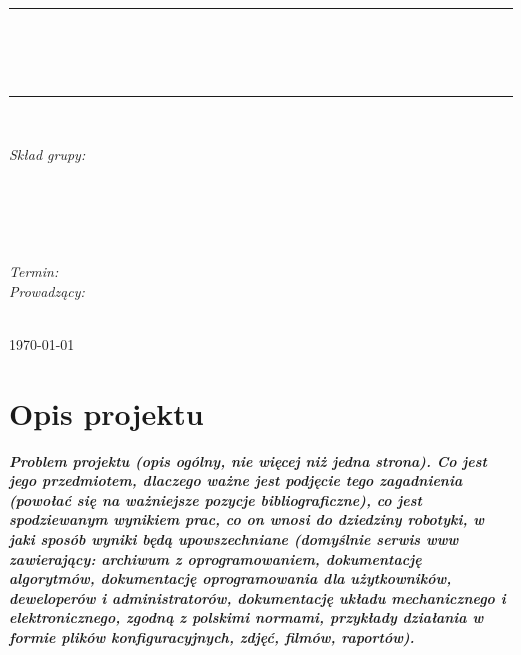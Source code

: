 \documentclass[10pt, a4paper]{article}
\begin{document}
\def\tablename{Tabela}	%

\begin{titlepage}
	\begin{center}
		\textsc{\LARGE \formakursu}\\[1cm]		
		\textsc{\Large \kurs}\\[0.5cm]		
		\rule{\textwidth}{0.08cm}\\[0.4cm]
		{\huge \bfseries \doctype}\\[1cm]
		{\huge \bfseries \projectname}\\[0.5cm]
		\rule{\textwidth}{0.08cm}\\[1cm]
		
		\begin{flushright} \large
		\emph{Skład grupy:}\\
		\osobaA\\
		\osobaB\\
		\osobaC\\
		\osobaD\\
		\osobaE\\[0.4cm]
		
		\emph{Termin: }\termin\\[0.4cm]

		\emph{Prowadzący:} \\
		\prowadzacy \\
		
		\end{flushright}
		
		\vfill
		
		{\large \today}
	\end{center}	
\end{titlepage}

\newpage
\tableofcontents
\newpage

\section{Opis projektu}
\label{sec:OpisProjektu}

\textit{\textbf{Problem projektu (opis ogólny, nie więcej niż jedna strona). Co jest jego przedmiotem, dlaczego ważne jest podjęcie tego zagadnienia (powołać się na ważniejsze pozycje bibliograficzne), co jest spodziewanym wynikiem prac, co on wnosi do dziedziny robotyki, w jaki sposób wyniki będą upowszechniane (domyślnie serwis www zawierający: archiwum z oprogramowaniem, dokumentację algorytmów, dokumentację oprogramowania dla użytkowników, deweloperów i administratorów, dokumentację układu mechanicznego i elektronicznego, zgodną z polskimi normami, przykłady działania w formie plików konfiguracyjnych, zdjęć, filmów, raportów).}}
\end{document}
